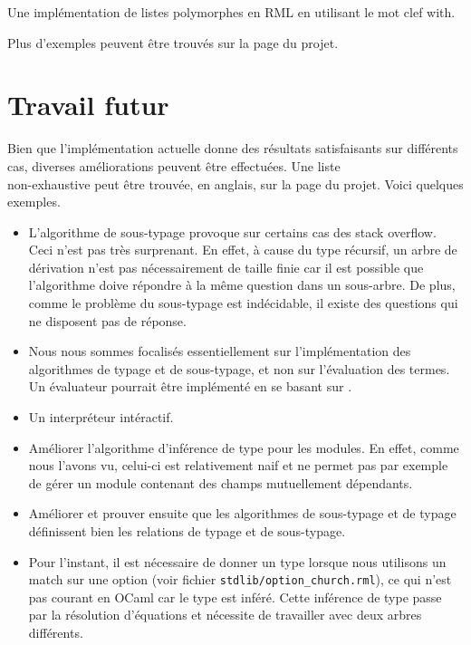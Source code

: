 \begin{listing}
  \inputminted{OCaml}{codes/list.rml}
  \caption{Une implémentation de listes polymorphes en RML en utilisant le mot
    clef with.}
  \label{code:rml-list-with}
\end{listing}

Plus d'exemples peuvent être trouvés sur la page du projet.

\section{Travail futur}

Bien que l'implémentation actuelle donne des résultats satisfaisants sur
différents cas, diverses améliorations peuvent être effectuées. Une liste \\
non-exhaustive peut être trouvée, en anglais, sur la page du
projet\cite{rml-github-issues}. Voici quelques exemples.

\begin{itemize}
  \item L'algorithme de sous-typage provoque sur certains cas des stack
    overflow. Ceci n'est pas très surprenant. En effet, à cause
    du type récursif, un arbre de dérivation n'est pas nécessairement de taille finie car
    il est possible que l'algorithme doive répondre à la même question dans un
    sous-arbre. De plus, comme le problème du sous-typage est indécidable, il
    existe des questions qui ne disposent pas de réponse.
  \item Nous nous sommes focalisés essentiellement sur l'implémentation des
    algorithmes de typage et de sous-typage, et non sur l'évaluation des termes.
    Un évaluateur pourrait être implémenté en se basant sur \cite{WF-DOT-2016}.
  \item Un interpréteur intéractif.
  \item Améliorer l'algorithme d'inférence de type pour les modules. En effet,
      comme nous l'avons vu, celui-ci est relativement naif et ne permet pas par
      exemple de gérer un module contenant des champs mutuellement dépendants.
  \item Améliorer et prouver ensuite que les algorithmes de sous-typage et de
      typage définissent bien les relations de typage et de sous-typage.
  \item Pour l'instant, il est nécessaire de donner un type lorsque nous
    utilisons un match sur une option (voir fichier \verb|stdlib/option_church.rml|), ce qui
    n'est pas courant en OCaml car le type est inféré. Cette inférence de type
    passe par la résolution d'équations et nécessite de travailler avec deux
    arbres différents.
\end{itemize}